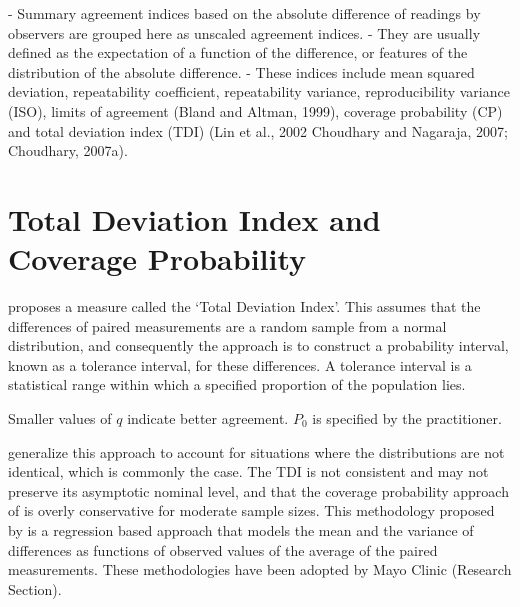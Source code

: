 \documentclass[MAIN.tex]{subfiles}
\begin{document}
	- Summary agreement indices based on the absolute difference of readings by observers are
	grouped here as unscaled agreement indices. 
	- They are usually defined as the expectation
	of a function of the difference, or features of the distribution of the absolute difference.
	- These indices include mean squared deviation, repeatability coefficient, repeatability variance,
	reproducibility variance (ISO), limits of agreement (Bland and Altman, 1999), coverage
	probability (CP) and total deviation index (TDI) (Lin et al., 2002 Choudhary and Nagaraja,
	2007; Choudhary, 2007a).
	
\section{Total Deviation Index and Coverage Probability}
	


\citet{lin2002} proposes a measure called the `Total Deviation Index'. 
This assumes that the differences of paired measurements are a random sample from a normal distribution, and consequently the approach is to construct a probability interval, known as a tolerance interval, for these differences. A tolerance interval is a statistical range within which a specified proportion of the population lies.


Smaller values of $q$ indicate better agreement. $P_{0}$ is specified by the practitioner.
	
\citet{pkcng} generalize this approach to account for situations where the distributions are not identical, which is commonly the case.
	The TDI is not consistent and may not preserve its asymptotic nominal level, and that the coverage probability approach of \citet{lin2002} is overly conservative for moderate sample sizes.
	This methodology proposed by \citet{pkcng} is a regression based approach that models the mean and the variance of differences as functions of observed values of the average of the paired measurements.
	These methodologies have been adopted by Mayo Clinic (Research Section).
	
	
\end{document}
